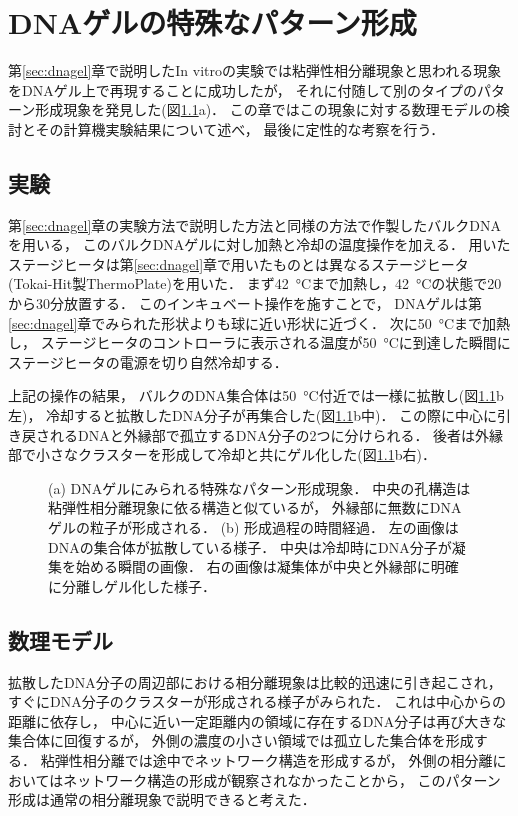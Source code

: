 \chapter{DNAゲルの特殊なパターン形成}

第\ref{sec:dnagel}章で説明したIn vitroの実験では粘弾性相分離現象と思われる現象をDNAゲル上で再現することに成功したが，
それに付随して別のタイプのパターン形成現象を発見した(図\ref{fig:result_special}a)．
この章ではこの現象に対する数理モデルの検討とその計算機実験結果について述べ，
最後に定性的な考察を行う．


\section{実験}
第\ref{sec:dnagel}章の実験方法で説明した方法と同様の方法で作製したバルクDNAを用いる，
このバルクDNAゲルに対し加熱と冷却の温度操作を加える．
用いたステージヒータは第\ref{sec:dnagel}章で用いたものとは異なるステージヒータ
(Tokai-Hit製ThermoPlate)を用いた．
まず\SI{42}{\celsius}まで加熱し，\SI{42}{\celsius}の状態で20から30分放置する．
このインキュベート操作を施すことで，
DNAゲルは第\ref{sec:dnagel}章でみられた形状よりも球に近い形状に近づく．
次に\SI{50}{\celsius}まで加熱し，
ステージヒータのコントローラに表示される温度が\SI{50}{\celsius}に到達した瞬間にステージヒータの電源を切り自然冷却する．

上記の操作の結果，
バルクのDNA集合体は\SI{50}{\celsius}付近では一様に拡散し(図\ref{fig:result_special}b左)，
冷却すると拡散したDNA分子が再集合した(図\ref{fig:result_special}b中)．
この際に中心に引き戻されるDNAと外縁部で孤立するDNA分子の2つに分けられる．
後者は外縁部で小さなクラスターを形成して冷却と共にゲル化した(図\ref{fig:result_special}b右)．
\begin{figure}
    \centering
    
    \caption{
        (a) DNAゲルにみられる特殊なパターン形成現象．
            中央の孔構造は粘弾性相分離現象に依る構造と似ているが，
            外縁部に無数にDNAゲルの粒子が形成される．
        (b) 形成過程の時間経過．
            左の画像はDNAの集合体が拡散している様子．
            中央は冷却時にDNA分子が凝集を始める瞬間の画像．
            右の画像は凝集体が中央と外縁部に明確に分離しゲル化した様子．
    }
    \label{fig:result_special}
\end{figure}


\section{数理モデル}
拡散したDNA分子の周辺部における相分離現象は比較的迅速に引き起こされ，
すぐにDNA分子のクラスターが形成される様子がみられた．
これは中心からの距離に依存し，
中心に近い一定距離内の領域に存在するDNA分子は再び大きな集合体に回復するが，
外側の濃度の小さい領域では孤立した集合体を形成する．
粘弾性相分離では途中でネットワーク構造を形成するが，
外側の相分離においてはネットワーク構造の形成が観察されなかったことから，
このパターン形成は通常の相分離現象で説明できると考えた．

